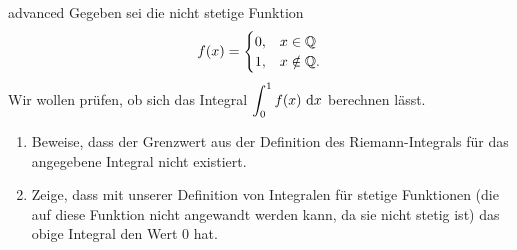 \documentclass[../lineare_gleichungen.tex]{subfiles}
\begin{document}
\begin{exercise}{advanced}
    Gegeben sei die nicht stetige Funktion
    \[f(x)=\begin{cases}
        0,&x\in\mathbb{Q}\\
        1,&x\notin\mathbb{Q}.
    \end{cases}\]
    Wir wollen prüfen, ob sich das Integral
    $\displaystyle\int_0^1f(x)\mathop{}\mathrm{d} x$
    berechnen lässt.
    \begin{enumerate}
        \item Beweise, dass der Grenzwert aus der Definition des Riemann-Integrals für das angegebene Integral nicht existiert.
        \item Zeige, dass mit unserer Definition von Integralen für stetige Funktionen (die auf diese Funktion nicht 
        angewandt werden kann, da sie nicht stetig ist) das obige Integral den Wert $0$ hat.
    \end{enumerate}
\end{exercise}
\end{document}
